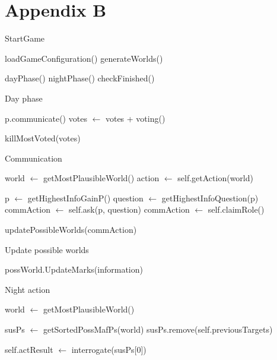 \section{Appendix B}\label{app:B}
\begin{algorithm}
	\caption{StartGame}
	\begin{algorithmic}[1]
		\State loadGameConfiguration()
		\State generateWorlds()

		\State dayPhase()
		\State nightPhase()
		\State checkFinished()
		\EndWhile
		\EndFunction
	\end{algorithmic}
\end{algorithm}

\begin{algorithm}
	\caption{Day phase}
	\begin{algorithmic}[1]
		\State p.communicate()
		\State votes $\gets$ votes + voting()
		\EndFor

		\State killMostVoted(votes)
		\EndFunction
	\end{algorithmic}
\end{algorithm}

\begin{algorithm}
	\caption{Communication}
	\begin{algorithmic}[1]
		\State world $\gets$ getMostPlausibleWorld()
		\State action $\gets$ self.getAction(world)

		\State p $\gets$ getHighestInfoGainP()
		\State question $\gets$ getHighestInfoQuestion(p)
		\State commAction $\gets$ self.ask(p, question)
		\State commAction $\gets$ self.claimRole()
		\EndIf

		\State updatePossibleWorlds(commAction)
		\EndFunction
	\end{algorithmic}
\end{algorithm}

\begin{algorithm}
	\caption{Update possible worlds}
	\begin{algorithmic}[1]
		\State possWorld.UpdateMarks(information)
		\EndFor
		\EndFor
		\EndFunction
	\end{algorithmic}
\end{algorithm}

\begin{algorithm}
	\caption{Night action}
	\begin{algorithmic}[1]
		\State world $\gets$ getMostPlausibleWorld()

		\State susPs $\gets$ getSortedPossMafPs(world)
		\State susPs.remove(self.previousTargets)

		\State self.actResult $\gets$ interrogate(susPs[0])
		\EndIf
		\EndFunction

		\Statex
	\end{algorithmic}
\end{algorithm}

